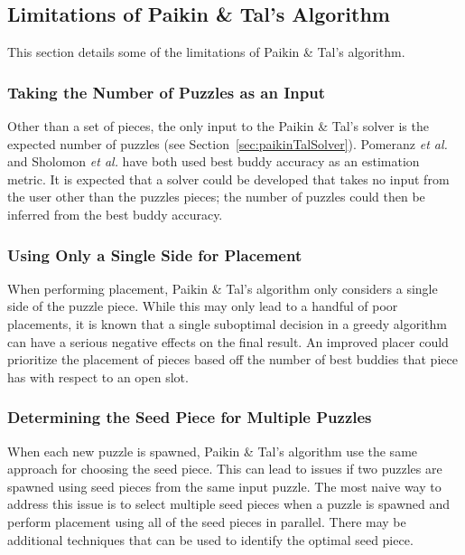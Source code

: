 \documentclass{report}
\begin{document}
\subsection{Limitations of Paikin \& Tal's Algorithm}\label{sec:paikinTalLimitations}

This section details some of the limitations of Paikin \& Tal's algorithm.  

\subsubsection{Taking the Number of Puzzles as an Input}\label{sec:limitationNumberPuzzles}

Other than a set of pieces, the only input to the Paikin \& Tal's solver is the expected number of puzzles (see Section~\ref{sec:paikinTalSolver}). Pomeranz \textit{et al.} and Sholomon \textit{et al.} have both used best buddy accuracy as an estimation metric.  It is expected that a solver could be developed that takes no input from the user other than the puzzles pieces; the number of puzzles could then be inferred from the best buddy accuracy.


\subsubsection{Using Only a Single Side for Placement}\label{sec:limitationPlacementSingleSide}

When performing placement, Paikin \& Tal's algorithm only considers a single side of the puzzle piece.  While this may only lead to a handful of poor placements, it is known that a single suboptimal decision in a greedy algorithm can have a serious negative effects on the final result.  An improved placer could prioritize the placement of pieces based off the number of best buddies that piece has with respect to an open slot.

\subsubsection{Determining the Seed Piece for Multiple Puzzles}\label{sec:limitationSeedPieceMultiplePuzzles}

When each new puzzle is spawned, Paikin \& Tal's algorithm use the same approach for choosing the seed piece.  This can lead to issues if two puzzles are spawned using seed pieces from the same input puzzle.  The most naive way to address this issue is to select multiple seed pieces when a puzzle is spawned and perform placement using all of the seed pieces in parallel.  There may be additional techniques that can be used to identify the optimal seed piece.
\end{document}
